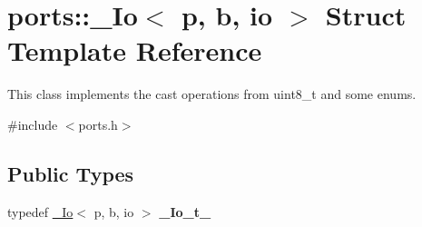 \hypertarget{structports_1_1__Io}{}\section{ports\+:\+:\+\_\+\+Io$<$ p, b, io $>$ Struct Template Reference}
\label{structports_1_1__Io}


This class implements the cast operations from uint8\+\_\+t and some enums.  




{\ttfamily \#include $<$ports.\+h$>$}

\subsection*{Public Types}
\begin{DoxyCompactItemize}
\item 
typedef \hyperlink{structports_1_1__Io}{\+\_\+\+Io}$<$ p, b, io $>$ {\bfseries \+\_\+\+Io\+\_\+t\+\_\+}\hypertarget{structports_1_1__Io_aa0e505ef1e6b227c9217b6e09bbc29dd}{}\label{structports_1_1__Io_aa0e505ef1e6b227c9217b6e09bbc29dd}

\end{DoxyCompactItemize}
